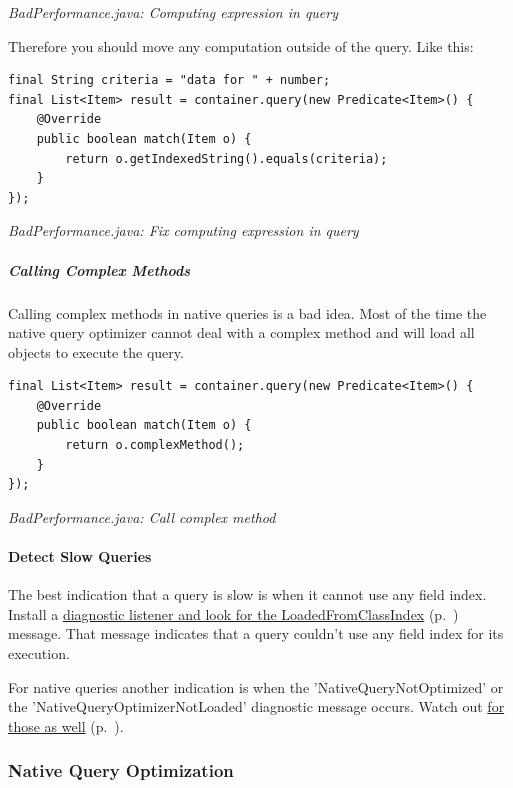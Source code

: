 {\small\itshape BadPerformance.java: Computing expression in query\par}
\medskip

Therefore you should move any computation outside of the query. Like this:

\begin{lstlisting}
final String criteria = "data for " + number;
final List<Item> result = container.query(new Predicate<Item>() {
    @Override
    public boolean match(Item o) {
        return o.getIndexedString().equals(criteria);
    }
});
\end{lstlisting}

{\small\itshape BadPerformance.java: Fix computing expression in query\par}
\medskip

\subparagraph*{Calling Complex Methods}

Calling complex methods in native queries is a bad idea. Most of the time the native query optimizer cannot deal with a complex method and will load all objects to execute the query.

\begin{lstlisting}
final List<Item> result = container.query(new Predicate<Item>() {
    @Override
    public boolean match(Item o) {
        return o.complexMethod();
    }
});
\end{lstlisting}

{\small\itshape BadPerformance.java: Call complex method\par}
\medskip

\paragraph{Detect Slow Queries}
\label{ref:basics-querying-native-queries-nq-performance-characteristics:detect}

The best indication that a query is slow is when it cannot use any field index. Install a \hyperref[ref:advanced-topics-diagnostics]{diagnostic listener and look for the LoadedFromClassIndex} (p.~\pageref{ref:advanced-topics-diagnostics}) message. That message indicates that a query couldn't use any field index for its execution.

For native queries another indication is when the 'NativeQueryNotOptimized' or the 'NativeQueryOptimizerNotLoaded' diagnostic message occurs. Watch out \hyperref[ref:advanced-topics-diagnostics]{for those as well} (p.~\pageref{ref:advanced-topics-diagnostics}).

\subsubsection{Native Query Optimization}
\label{ref:basics-querying-native-queries-native-query-optimization}


